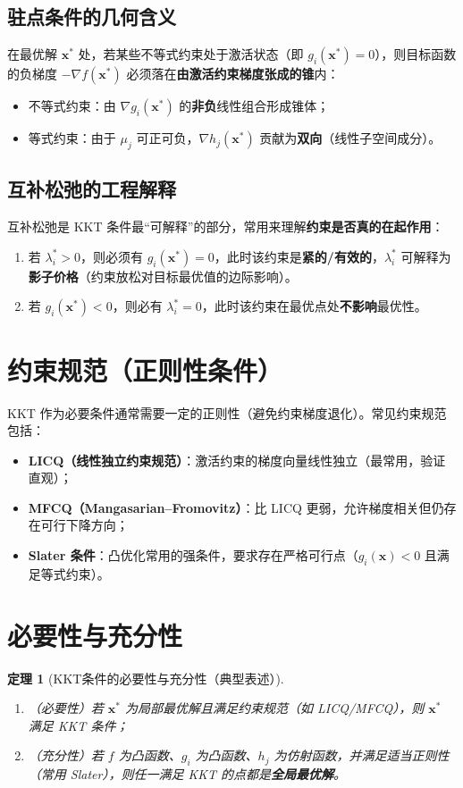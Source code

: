 \documentclass[12pt,a4paper]{ctexart}
\renewcommand{\vec}[1]{\boldsymbol{#1}} %
\theoremstyle{definition}
\theoremstyle{plain}
\newtheorem{theorem}{定理}[section]
\begin{document}
	\subsection{驻点条件的几何含义}
	在最优解 $\vec{x}^*$ 处，若某些不等式约束处于激活状态（即 $g_i(\vec{x}^*)=0$），则目标函数的负梯度
	$-\nabla f(\vec{x}^*)$ 必须落在\textbf{由激活约束梯度张成的锥}内：
	\begin{itemize}
		\item 不等式约束：由 $\nabla g_i(\vec{x}^*)$ 的\textbf{非负}线性组合形成锥体；
		\item 等式约束：由于 $\mu_j$ 可正可负，$\nabla h_j(\vec{x}^*)$ 贡献为\textbf{双向}（线性子空间成分）。
	\end{itemize}
	
	\subsection{互补松弛的工程解释}
	互补松弛是 KKT 条件最“可解释”的部分，常用来理解\textbf{约束是否真的在起作用}：
	\begin{enumerate}
		\item 若 $\lambda_i^*>0$，则必须有 $g_i(\vec{x}^*)=0$，此时该约束是\textbf{紧的/有效的}，$\lambda_i^*$ 可解释为\textbf{影子价格}（约束放松对目标最优值的边际影响）。
		\item 若 $g_i(\vec{x}^*)<0$，则必有 $\lambda_i^*=0$，此时该约束在最优点处\textbf{不影响}最优性。
	\end{enumerate}
	
	\section{约束规范（正则性条件）}
	KKT 作为必要条件通常需要一定的正则性（避免约束梯度退化）。常见约束规范包括：
	\begin{itemize}
		\item \textbf{LICQ（线性独立约束规范）}：激活约束的梯度向量线性独立（最常用，验证直观）；
		\item \textbf{MFCQ（Mangasarian--Fromovitz）}：比 LICQ 更弱，允许梯度相关但仍存在可行下降方向；
		\item \textbf{Slater 条件}：凸优化常用的强条件，要求存在严格可行点（$g_i(\vec{x})<0$ 且满足等式约束）。
	\end{itemize}
	
	\section{必要性与充分性}
	\begin{theorem}[KKT条件的必要性与充分性（典型表述）]
		\begin{enumerate}
			\item （必要性）若 $\vec{x}^*$ 为局部最优解且满足约束规范（如 LICQ/MFCQ），则 $\vec{x}^*$ 满足 KKT 条件；
			\item （充分性）若 $f$ 为凸函数、$g_i$ 为凸函数、$h_j$ 为仿射函数，并满足适当正则性（常用 Slater），则任一满足 KKT 的点都是\textbf{全局最优解}。
		\end{enumerate}
	\end{theorem}
	
\end{document}
